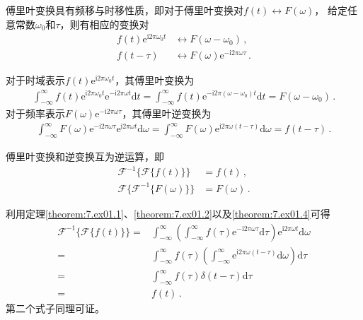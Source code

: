\begin{theorem}\label{theorem:7.ex01.4}
    傅里叶变换具有频移与时移性质，即对于傅里叶变换对$f(t)\leftrightarrow F(\omega)$，
    给定任意常数$\omega_0$和$\tau$，则有相应的变换对
    \begin{align}
        f(t)\mathrm{e}^{\mathrm{i}2\pi\omega_0 t} & \leftrightarrow F(\omega-\omega_0)\, ,                              \\
        f(t-\tau)                                 & \leftrightarrow F(\omega)\mathrm{e}^{-\mathrm{i}2\pi\omega\tau}\, .
    \end{align}
\end{theorem}
\begin{prove}
    对于时域表示$f(t)\mathrm{e}^{\mathrm{i}2\pi\omega_0 t}$，其傅里叶变换为
    \begin{align}
        \int_{-\infty}^{\infty}f(t)\mathrm{e}^{\mathrm{i}2\pi\omega_0 t}\mathrm{e}^{-\mathrm{i}2\pi\omega t}\mathrm{d}t
        =\int_{-\infty}^{\infty}f(t)\mathrm{e}^{-\mathrm{i}2\pi(\omega-\omega_0) t}\mathrm{d}t=F(\omega-\omega_0)\, .
    \end{align}
    对于频率表示$F(\omega)\mathrm{e}^{-\mathrm{i}2\pi\omega\tau}$，其傅里叶逆变换为
    \begin{align}
        \int_{-\infty}^{\infty}F(\omega)\mathrm{e}^{-\mathrm{i}2\pi\omega\tau}\mathrm{e}^{\mathrm{i}2\pi\omega t}\mathrm{d}\omega
        =\int_{-\infty}^{\infty}F(\omega)\mathrm{e}^{\mathrm{i}2\pi\omega(t-\tau)}\mathrm{d}\omega
        =f(t-\tau)\, .
    \end{align}
\end{prove}

\begin{theorem}
    傅里叶变换和逆变换互为逆运算，即
    \begin{align}
        \mathcal{F}^{-1}\{\mathcal{F}\{f(t)\}\}      & =f(t)\, ,      \\
        \mathcal{F}\{\mathcal{F}^{-1}\{F(\omega)\}\} & =F(\omega)\, .
    \end{align}
\end{theorem}
\begin{prove}
    利用定理\ref{theorem:7.ex01.1}、\ref{theorem:7.ex01.2}以及\ref{theorem:7.ex01.4}可得
    \begin{align}
        \mathcal{F}^{-1}\{\mathcal{F}\{f(t)\}\}= & \int_{-\infty}^{\infty}\left(\int_{-\infty}^{\infty}f(\tau)\mathrm{e}^{-\mathrm{i}2\pi\omega\tau}\mathrm{d}\tau\right)\mathrm{e}^{\mathrm{i}2\pi\omega t}\mathrm{d}\omega\nonumber \\
        =                                        & \int_{-\infty}^{\infty}f(\tau)\left(\int_{-\infty}^{\infty}\mathrm{e}^{\mathrm{i}2\pi\omega(t-\tau)}\mathrm{d}\omega\right)\mathrm{d}\tau\nonumber                                 \\
        =                                        & \int_{-\infty}^{\infty}f(\tau)\delta(t-\tau)\mathrm{d}\tau\nonumber                                                                                                                \\
        =                                        & f(t)\, .
    \end{align}
    第二个式子同理可证。
\end{prove}

